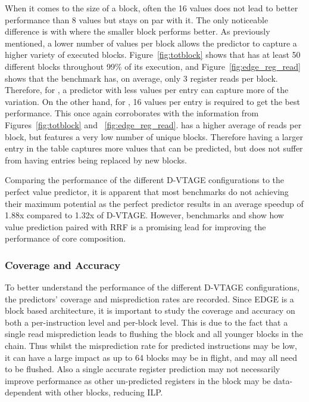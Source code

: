 When it comes to the size of a block, often the 16 values does not lead to better performance than 8 values but stays on par with it.
The only noticeable difference is with  where the smaller block performs better.
As previously mentioned, a lower number of values per block allows the predictor to capture a higher variety of executed blocks.
Figure~\ref{fig:totblock} shows that  has at least 50 different blocks throughout 99\% of its execution, and Figure~\ref{fig:edge_reg_read} shows that the benchmark has, on average, only 3 register reads per block.
Therefore, for , a predictor with less values per entry can capture more of the variation.
On the other hand, for , 16 values per entry is required to get the best performance.
This once again corroborates with the information from Figures~\ref{fig:totblock} and ~\ref{fig:edge_reg_read}.
 has a higher average of reads per block, but features a very low number of unique blocks.
Therefore having a larger entry in the table captures more values that can be predicted, but does not suffer from having entries being replaced by new blocks.

Comparing the performance of the different D-VTAGE configurations to the perfect value predictor, it is apparent that most benchmarks do not achieving their maximum potential as the perfect predictor results in an average speedup of 1.88x compared to 1.32x of D-VTAGE.
However, benchmarks  and  show how value prediction paired with RRF is a promising lead for improving the performance of core composition.

\subsubsection{Coverage and Accuracy}
To better understand the performance of the different D-VTAGE configurations, the predictors' coverage and misprediction rates are recorded.
Since EDGE is a block based architecture, it is important to study the coverage and accuracy on both a per-instruction level and per-block level.
This is due to the fact that a single read misprediction leads to flushing the block and all younger blocks in the chain.
Thus whilst the misprediction rate for predicted instructions may be low, it can have a large impact as up to 64 blocks may be in flight, and may all need to be flushed.
Also a single accurate register prediction may not necessarily improve performance as other un-predicted registers in the block may be data-dependent with other blocks, reducing ILP.

